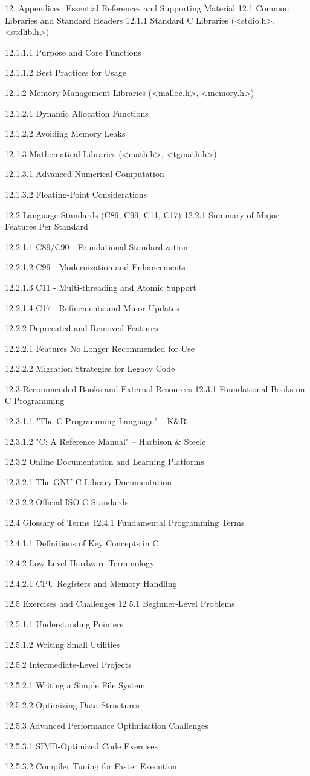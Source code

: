 12. Appendices: Essential References and Supporting Material
12.1 Common Libraries and Standard Headers
12.1.1 Standard C Libraries (<stdio.h>, <stdlib.h>)

12.1.1.1 Purpose and Core Functions

12.1.1.2 Best Practices for Usage

12.1.2 Memory Management Libraries (<malloc.h>, <memory.h>)

12.1.2.1 Dynamic Allocation Functions

12.1.2.2 Avoiding Memory Leaks

12.1.3 Mathematical Libraries (<math.h>, <tgmath.h>)

12.1.3.1 Advanced Numerical Computation

12.1.3.2 Floating-Point Considerations

12.2 Language Standards (C89, C99, C11, C17)
12.2.1 Summary of Major Features Per Standard

12.2.1.1 C89/C90 - Foundational Standardization

12.2.1.2 C99 - Modernization and Enhancements

12.2.1.3 C11 - Multi-threading and Atomic Support

12.2.1.4 C17 - Refinements and Minor Updates

12.2.2 Deprecated and Removed Features

12.2.2.1 Features No Longer Recommended for Use

12.2.2.2 Migration Strategies for Legacy Code

12.3 Recommended Books and External Resources
12.3.1 Foundational Books on C Programming

12.3.1.1 "The C Programming Language" – K&R

12.3.1.2 "C: A Reference Manual" – Harbison & Steele

12.3.2 Online Documentation and Learning Platforms

12.3.2.1 The GNU C Library Documentation

12.3.2.2 Official ISO C Standards

12.4 Glossary of Terms
12.4.1 Fundamental Programming Terms

12.4.1.1 Definitions of Key Concepts in C

12.4.2 Low-Level Hardware Terminology

12.4.2.1 CPU Registers and Memory Handling

12.5 Exercises and Challenges
12.5.1 Beginner-Level Problems

12.5.1.1 Understanding Pointers

12.5.1.2 Writing Small Utilities

12.5.2 Intermediate-Level Projects

12.5.2.1 Writing a Simple File System

12.5.2.2 Optimizing Data Structures

12.5.3 Advanced Performance Optimization Challenges

12.5.3.1 SIMD-Optimized Code Exercises

12.5.3.2 Compiler Tuning for Faster Execution

